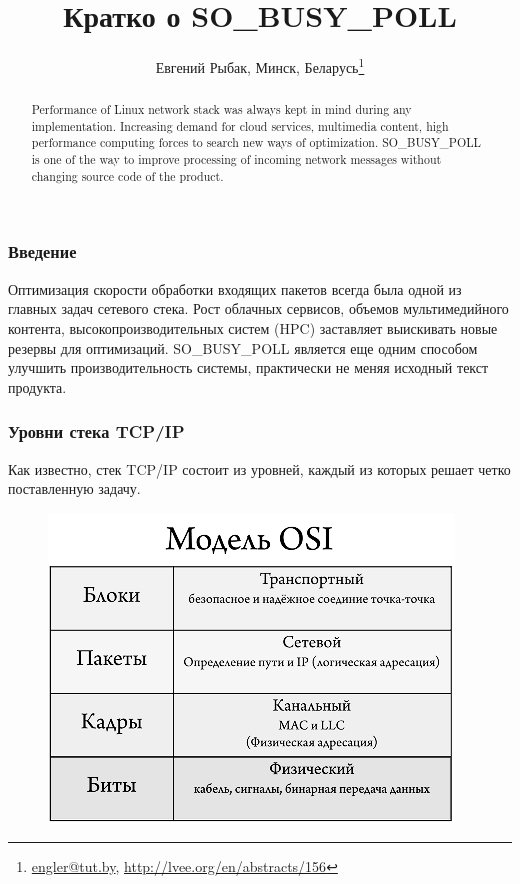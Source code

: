 \documentclass[10pt, a5paper]{article}
\begin{document}
\title{Кратко о SO\_BUSY\_POLL}
\author{Евгений Рыбак, Минск, Беларусь\footnote{\url{engler@tut.by}, \url{http://lvee.org/en/abstracts/156}}}
\maketitle
\begin{abstract}
Performance of Linux network stack was always kept in mind during any implementation. Increasing demand for cloud services, multimedia content, high performance computing forces to search new ways of optimization. SO\_BUSY\_POLL is one of the way to improve processing of incoming network messages without changing source code of the product.
\end{abstract}
\subsubsection*{Введение}

Оптимизация скорости обработки входящих пакетов всегда была одной из главных задач сетевого стека. Рост облачных сервисов, объемов мультимедийного контента, высокопроизводительных систем (HPC) заставляет выискивать новые резервы для оптимизаций. SO\_BUSY\_POLL является еще одним способом улучшить производительность системы, практически не меняя исходный текст продукта.

\subsubsection*{Уровни стека TCP/IP}

Как известно, стек TCP/IP состоит из уровней, каждый из которых решает четко поставленную задачу.


\begin{figure}[h!]
  \centering 
  \includegraphics[scale=0.6]{15_2015_Osi-model-50}
\end{figure}
\end{document}
